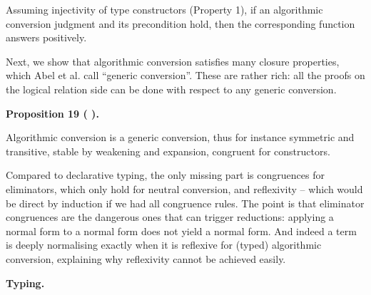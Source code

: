 \documentclass[10pt,a4paper]{amsart}
\begin{document}
 
Assuming injectivity of type constructors (Property 1), if an algorithmic conversion judgment and its precondition hold, then the corresponding function answers positively.\par
 
 
 
 
Next, we show that algorithmic conversion satisfies many closure properties, which Abel et al. call “generic conversion”. These are rather rich: all the proofs on the logical relation side can be done with respect to any generic conversion.\par
 
 
 
\par\medskip\noindent\textbf{Proposition 19 ( ).}\par
 
 
Algorithmic conversion is a generic conversion, thus for instance symmetric and transitive, stable by weakening and expansion, congruent for constructors.\par
 
 
 
 
Compared to declarative typing, the only missing part is congruences for eliminators, which only hold for neutral conversion, and reflexivity – which would be direct by induction if we had all congruence rules. The point is that eliminator congruences are the dangerous ones that can trigger reductions: applying a normal form to a normal form does not yield a normal form. And indeed a term is deeply normalising exactly when it is reflexive for (typed) algorithmic conversion, explaining why reflexivity cannot be achieved easily.\par
 
 
 
 
\par\medskip\noindent\textbf{Typing.}\par
 
\end{document}
